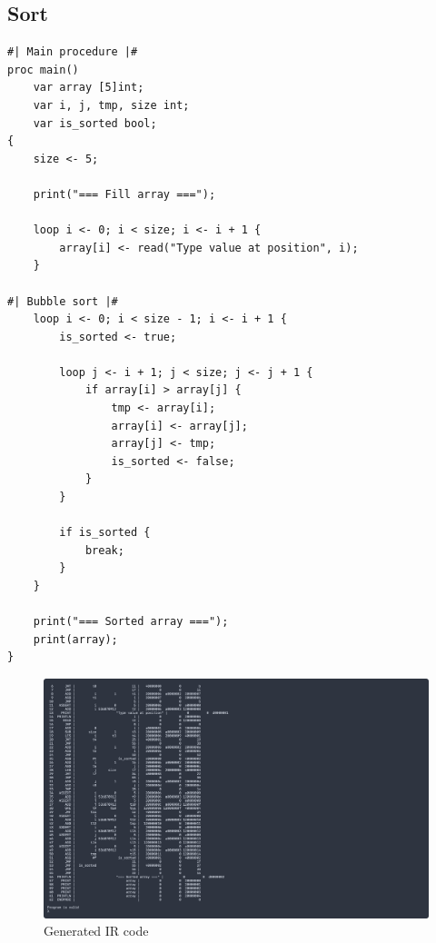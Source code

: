 \newpage

\subsection{Sort}

\begin{verbatim}
#| Main procedure |#
proc main()
    var array [5]int;
    var i, j, tmp, size int;
    var is_sorted bool;
{
    size <- 5;

    print("=== Fill array ===");

    loop i <- 0; i < size; i <- i + 1 {
        array[i] <- read("Type value at position", i);
    }

#| Bubble sort |#
    loop i <- 0; i < size - 1; i <- i + 1 {
        is_sorted <- true;

        loop j <- i + 1; j < size; j <- j + 1 {
            if array[i] > array[j] {
                tmp <- array[i];
                array[i] <- array[j];
                array[j] <- tmp;
                is_sorted <- false;
            }
        }

        if is_sorted {
            break;
        }
    }
    
    print("=== Sorted array ===");
    print(array);
}
\end{verbatim}

\begin{figure}[H]
    \centering
    \caption{Generated IR code}
    \includegraphics[width=\textwidth]{evidences/sort_ir}
\end{figure}

